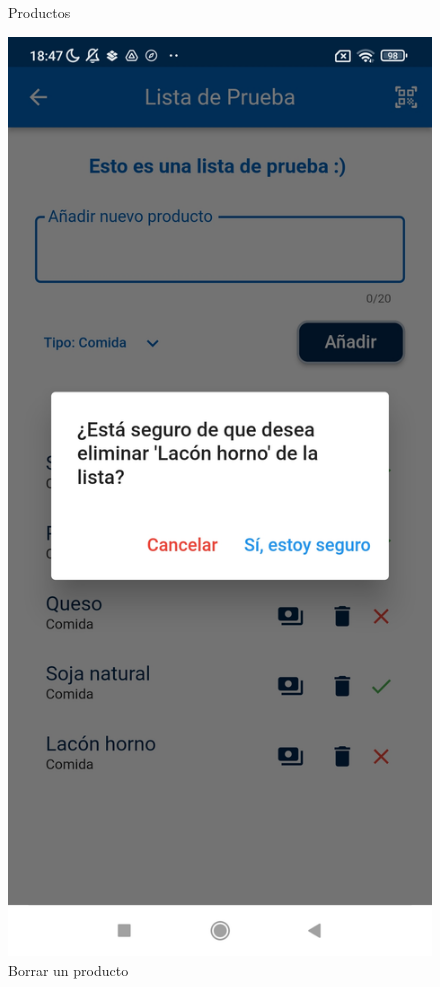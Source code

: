 \documentclass{article}
\begin{document}
\begin{figure}[h]
\begin{minipage}[h]{0.35\textwidth}
        \caption{Productos}
        \label{fig:productos}
    \end{minipage}
    \hspace{1cm}
    \begin{minipage}[h]{0.35\textwidth}
        \includegraphics[width=\textwidth]{imagenes/pantallas/listas/modal_borrar_producto.jpg}
        \caption{Borrar un producto}
    \end{minipage}
\end{figure}
\end{document}
